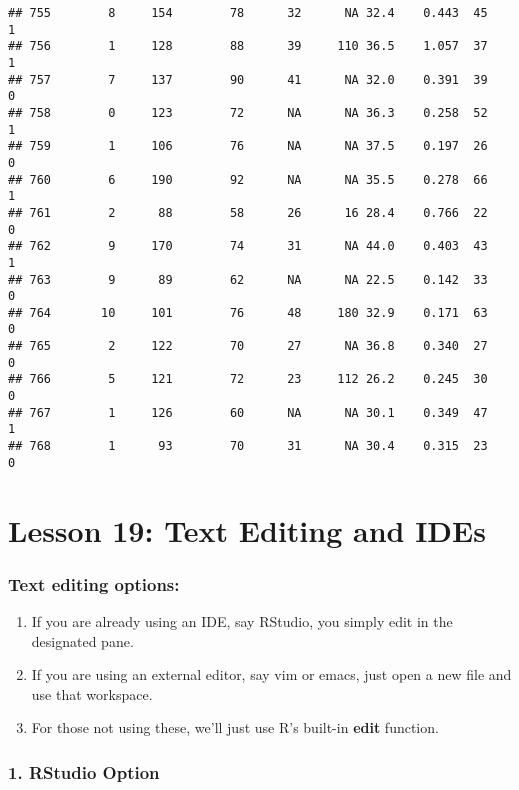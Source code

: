 \documentclass[
]{article}
\begin{document}
\begin{verbatim}
## 755        8     154        78      32      NA 32.4    0.443  45    1
## 756        1     128        88      39     110 36.5    1.057  37    1
## 757        7     137        90      41      NA 32.0    0.391  39    0
## 758        0     123        72      NA      NA 36.3    0.258  52    1
## 759        1     106        76      NA      NA 37.5    0.197  26    0
## 760        6     190        92      NA      NA 35.5    0.278  66    1
## 761        2      88        58      26      16 28.4    0.766  22    0
## 762        9     170        74      31      NA 44.0    0.403  43    1
## 763        9      89        62      NA      NA 22.5    0.142  33    0
## 764       10     101        76      48     180 32.9    0.171  63    0
## 765        2     122        70      27      NA 36.8    0.340  27    0
## 766        5     121        72      23     112 26.2    0.245  30    0
## 767        1     126        60      NA      NA 30.1    0.349  47    1
## 768        1      93        70      31      NA 30.4    0.315  23    0
\end{verbatim}

\hypertarget{lesson-19-text-editing-and-ides}{%
\section{Lesson 19: Text Editing and
IDEs}\label{lesson-19-text-editing-and-ides}}

\hypertarget{text-editing-options}{%
\subsubsection{Text editing options:}\label{text-editing-options}}

\begin{enumerate}
\def\labelenumi{\arabic{enumi}.}
\item
  If you are already using an IDE, say RStudio, you simply edit in the
  designated pane.
\item
  If you are using an external editor, say vim or emacs, just open a new
  file and use that workspace.
\item
  For those not using these, we'll just use R's built-in \textbf{edit}
  function.
\end{enumerate}

\hypertarget{rstudio-option}{%
\subsubsection{1. RStudio Option}\label{rstudio-option}}
\end{document}
